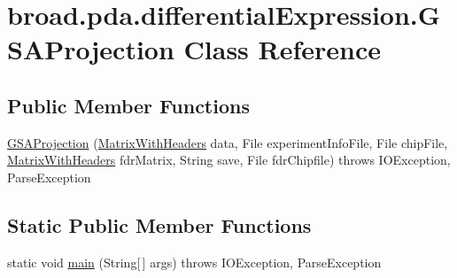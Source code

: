 \hypertarget{classbroad_1_1pda_1_1differential_expression_1_1_g_s_a_projection}{\section{broad.\+pda.\+differential\+Expression.\+G\+S\+A\+Projection Class Reference}
\label{classbroad_1_1pda_1_1differential_expression_1_1_g_s_a_projection}
}
\subsection*{Public Member Functions}
\begin{DoxyCompactItemize}
\item 
\hyperlink{classbroad_1_1pda_1_1differential_expression_1_1_g_s_a_projection_a36ad523a42364f0dc316f7ecb70ea269}{G\+S\+A\+Projection} (\hyperlink{classbroad_1_1core_1_1datastructures_1_1_matrix_with_headers}{Matrix\+With\+Headers} data, File experiment\+Info\+File, File chip\+File, \hyperlink{classbroad_1_1core_1_1datastructures_1_1_matrix_with_headers}{Matrix\+With\+Headers} fdr\+Matrix, String save, File fdr\+Chipfile)  throws I\+O\+Exception, Parse\+Exception
\end{DoxyCompactItemize}
\subsection*{Static Public Member Functions}
\begin{DoxyCompactItemize}
\item 
static void \hyperlink{classbroad_1_1pda_1_1differential_expression_1_1_g_s_a_projection_a153db78475d8411a07b9ad6fa70459f1}{main} (String\mbox{[}$\,$\mbox{]} args)  throws I\+O\+Exception, Parse\+Exception
\end{DoxyCompactItemize}


